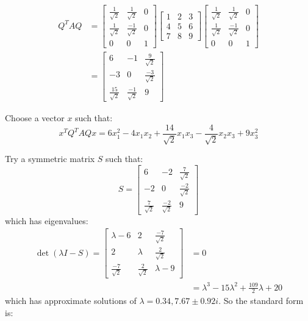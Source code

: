 \documentclass[11pt]{homework}
\begin{document}
\begin{align*}
Q^T A Q &= 
  \begin{bmatrix}
    \frac{1}{\sqrt{2}} & \frac{1}{\sqrt{2}} & 0 \\
    \frac{1}{\sqrt{2}}   & \frac{-1}{\sqrt{2}} & 0 \\
    0 & 0 & 1
  \end{bmatrix}
  \begin{bmatrix}
    1 & 2 & 3 \\
    4 & 5 & 6 \\
    7 & 8 & 9 
  \end{bmatrix}
  \begin{bmatrix}
    \frac{1}{\sqrt{2}} & \frac{1}{\sqrt{2}}  & 0 \\
    \frac{1}{\sqrt{2}} & \frac{-1}{\sqrt{2}} & 0 \\
    0                  & 0                   & 1
  \end{bmatrix} \\
  &=
  \begin{bmatrix}
  6  & -1 & \frac{9}{\sqrt{2}} \\
  -3 & 0 & \frac{-3}{\sqrt{2}} \\
  \frac{15}{\sqrt{2}} & \frac{-1}{\sqrt{2}} & 9
  \end{bmatrix}
\end{align*}

Choose a vector $x$ such that:
\begin{equation*}
x^T Q^T A Q x = 
  6 x_1^2 
  -4 x_1 x_2
  +\frac{14}{\sqrt{2}} x_1 x_3 
  -\frac{4}{\sqrt{2}} x_2 x_3 
  +9 x_3^2
\end{equation*}

Try a symmetric matrix $S$ such that:
\begin{equation*}
S =
  \begin{bmatrix}
    6 & -2 & \frac{7}{\sqrt{2}} \\
    -2 & 0 & \frac{-2}{\sqrt{2}} \\
    \frac{7}{\sqrt{2}} & \frac{-2}{\sqrt{2}} & 9
  \end{bmatrix}
\end{equation*}
which has eigenvalues:
\begin{align*}
\det (\lambda I - S ) =
  \begin{bmatrix}
    \lambda - 6 & 2 & \frac{-7}{\sqrt{2}} \\
    2 & \lambda & \frac{2}{\sqrt{2}} \\
    \frac{-7}{\sqrt{2}} & \frac{2}{\sqrt{2}} & \lambda-9
  \end{bmatrix}
  &= 0 \\
  &= \lambda^3 - 15 \lambda^2 + \frac{109}{2} \lambda + 20
\end{align*}
\noindent
which has approximate solutions of $\lambda = 0.34, 7.67 \pm 0.92i$.
So the standard form is:
\end{document}
